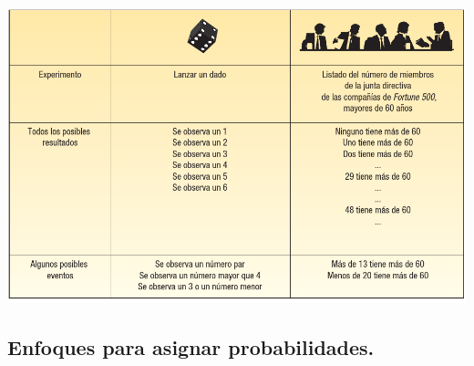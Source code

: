 \documentclass[]{article}
\begin{document}
\includegraphics[width=16cm]{imagenes/TablaCap5_2.PNG}
\subsection{Enfoques para asignar probabilidades.}
\end{document}
